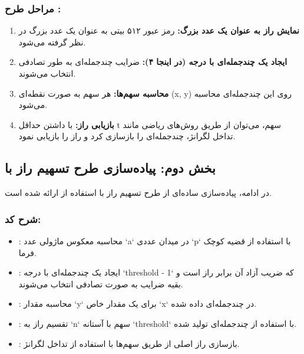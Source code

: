 \documentclass{report}
\begin{document}
\subsubsection*{مراحل طرح :}
\begin{enumerate}
	\item \textbf{نمایش راز به عنوان یک عدد بزرگ:}
	 رمز عبور ۵۱۲ بیتی به عنوان یک عدد بزرگ در نظر گرفته می‌شود.
	\item \textbf{ایجاد یک چندجمله‌ای با درجه  (در اینجا ۴):}
	 ضرایب چندجمله‌ای به طور تصادفی انتخاب می‌شوند.
	\item \textbf{محاسبه سهم‌ها:}
	 هر سهم به صورت نقطه‌ای (x, y) روی این چندجمله‌ای محاسبه می‌شود.
	\item \textbf{بازیابی راز:}
	 با داشتن حداقل t سهم، می‌توان از طریق روش‌های ریاضی مانند تداخل لگرانژ، چندجمله‌ای را بازسازی کرد و راز را بازیابی نمود.
\end{enumerate}

\subsection*{بخش دوم: پیاده‌سازی طرح تسهیم راز  با }
در ادامه، پیاده‌سازی ساده‌ای از طرح تسهیم راز  با استفاده از  ارائه شده است.

\subsubsection*{شرح کد:}
\begin{itemize}
	\item \textbf{}:
	محاسبه معکوس ماژولی عدد `a` در میدان عددی `p` با استفاده از قضیه کوچک فرما.
	\item \textbf{}:
	ایجاد یک چندجمله‌ای با درجه `threshold - 1` که ضریب آزاد آن برابر راز است و بقیه ضرایب به صورت تصادفی انتخاب می‌شوند.
	\item \textbf{}:
	محاسبه مقدار `y` برای یک مقدار خاص `x` در چندجمله‌ای داده شده.
	\item \textbf{}:
	تقسیم راز به `n` سهم با آستانه `threshold` با استفاده از چندجمله‌ای تولید شده.
	\item \textbf{}:
	بازسازی راز اصلی از طریق سهم‌ها با استفاده از تداخل لگرانژ.
\end{itemize}
\end{document}
